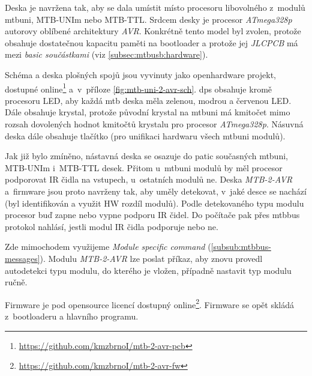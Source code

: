 Deska je navržena tak, aby se dala umístit místo procesoru libovolného z~modulů
\gls{mtbuni}, MTB-UNIm nebo MTB-TTL. Srdcem desky je procesor
\textit{ATmega328p} autorovy oblíbené architektury \textit{AVR}.
Konkrétně tento model byl zvolen, protože obsahuje dostatečnou kapacitu paměti
na bootloader a protože jej \textit{JLCPCB} má mezi \textit{basic součástkami}
(viz \ref{subsec:mtbusb:hardware}).

Schéma a deska plošných spojů jsou vyvinuty jako openhardware projekt, dostupné
online\footnote{\url{https://github.com/kmzbrnoI/mtb-2-avr-pcb}} a~v~příloze
\ref{fig:mtb-uni-2-avr-sch}. \gls{dps} obsahuje kromě procesoru LED, aby každá
\gls{mtb} deska měla zelenou, modrou a červenou LED. Dále obsahuje krystal,
protože původní krystal na \gls{mtbuni} má kmitočet mimo rozsah dovolených
hodnot kmitočtů krystalu pro procesor \textit{ATmega328p}. Násuvná deska dále
obsahuje tlačítko (pro unifikaci hardwaru všech \gls{mtbuni} modulů).

Jak již bylo zmíněno, nástavná deska se osazuje do patic současných
\gls{mtbuni}, MTB-UNIm i~MTB-TTL desek. Přitom u~\gls{mtbuni} modulů by měl
procesor podporovat IR čidla na vstupech, u~ostatních modulů ne. Deska \textit{MTB-2-AVR}
a~firmware jsou proto navrženy tak, aby uměly detekovat, v~jaké desce se
nachází (byl identifikován a využit HW rozdíl modulů). Podle detekovaného typu
modulu procesor buď zapne nebo vypne podporu IR čidel. Do počítače pak přes
\gls{mtbbus} protokol nahlásí, jestli modul IR čidla podporuje nebo ne.

Zde mimochodem využijeme \textit{Module specific command}
(\ref{subsub:mtbbus-messages}). Modulu \textit{MTB-2-AVR} lze poslat příkaz,
aby znovu provedl autodetekci typu modulu, do kterého je vložen, případně
nastavit typ modulu ručně.

Firmware je pod opensource licencí dostupný
online\footnote{\url{https://github.com/kmzbrnoI/mtb-2-avr-fw}}.
Firmware se opět skládá z~bootloaderu a hlavního programu.
